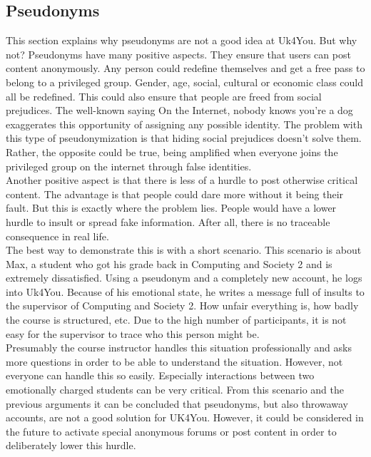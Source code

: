 \subsection{Pseudonyms}
This section explains why pseudonyms are not a good idea at Uk4You.
But why not? Pseudonyms have many positive aspects.
They ensure that users can post content anonymously.
Any person could redefine themselves and get a free pass to belong to a privileged group.
Gender, age, social, cultural or economic class could all be redefined.
This could also ensure that people are freed from social prejudices.
The well-known saying \glqq On the Internet, nobody knows you're a dog\grqq{} exaggerates this opportunity of assigning any possible identity\cite{steiner-internet-dog}.
The problem with this type of pseudonymization is that hiding social prejudices doesn't solve them.
Rather, the opposite could be true, being amplified when everyone joins the privileged group on the internet through false identities.\\

Another positive aspect is that there is less of a hurdle to post otherwise critical content.
The advantage is that people could dare more without it being their fault.
But this is exactly where the problem lies.
People would have a lower hurdle to insult or spread fake information.
After all, there is no traceable consequence in real life.\\

The best way to demonstrate this is with a short scenario.
This scenario is about Max, a student who got his grade back in Computing and Society 2 and is extremely dissatisfied.
Using a pseudonym and a completely new account, he logs into Uk4You.
Because of his emotional state, he writes a message full of insults to the supervisor of Computing and Society 2.
How unfair everything is, how badly the course is structured, etc.
Due to the high number of participants, it is not easy for the supervisor to trace who this person might be.\\

Presumably the course instructor handles this situation professionally and asks more questions in order to be able to understand the situation.
However, not everyone can handle this so easily.
Especially interactions between two emotionally charged students can be very critical.
From this scenario and the previous arguments it can be concluded that pseudonyms, but also throwaway accounts, are not a good solution for UK4You.
However, it could be considered in the future to activate special anonymous forums or post content in order to deliberately lower this hurdle.
